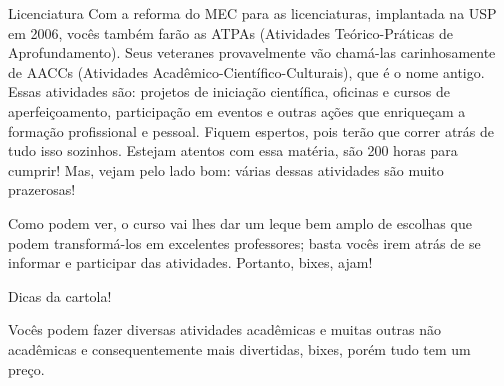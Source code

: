 \begin{subsecao}{Licenciatura}
Com a reforma do MEC para as licenciaturas, implantada na USP em 2006,
vocês também farão as ATPAs (Atividades Teórico-Práticas de Aprofundamento).
Seus veteranes provavelmente vão chamá-las carinhosamente de AACCs (Atividades
Acadêmico-Científico-Culturais), que é o nome antigo. Essas atividades são:
projetos de iniciação científica, oficinas e cursos de aperfeiçoamento,
participação em eventos e outras ações que enriqueçam a formação profissional e
pessoal. Fiquem espertos, pois terão que correr atrás de tudo isso sozinhos.
Estejam atentos com essa matéria, são 200 horas para cumprir! Mas, vejam pelo
lado bom: várias dessas atividades são muito prazerosas!

Como podem ver, o curso vai lhes dar um leque bem amplo de escolhas que
podem transformá-los em excelentes professores; basta vocês irem atrás de
se informar e participar das atividades. Portanto, bixes, ajam!

\begin{subsubsecao}{Dicas da cartola!}

Vocês podem fazer diversas atividades acadêmicas e muitas outras não acadêmicas e
consequentemente mais divertidas, bixes, porém tudo tem um preço.


\end{subsubsecao}
\end{subsecao}
